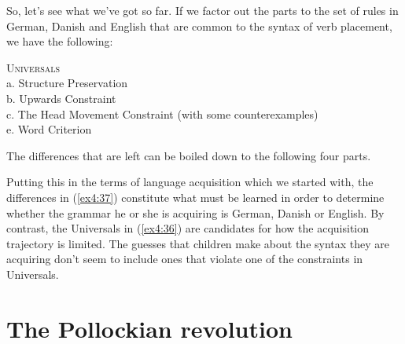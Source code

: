 So, let's see what we've got so far. If we factor out the parts to the set of rules in German, Danish and English that are common to the syntax of verb placement, we have the following:
\begin{exe}
	\ex \label{ex4:36} \textsc{Universals}\\
								a. Structure Preservation\\ 
								b. Upwards Constraint\\ 
								c. The Head Movement Constraint (with some counterexamples)\\ 
								e. Word Criterion
\end{exe}
The differences that are left can be boiled down to the following four parts.
\enlargethispage*{22pt}
\begin{exe}
	\ex \label{ex4:37} 
	\begin{xlist}
	\end{xlist}
\end{exe}
Putting this in the terms of language acquisition which we started with, the differences in (\ref{ex4:37}) constitute what must be learned in order to determine whether the grammar he or she is acquiring is German, Danish or English. By contrast, the Universals in (\ref{ex4:36}) are candidates for how the acquisition trajectory is limited. The guesses that children make about the syntax they are acquiring don't seem to include ones that violate one of the constraints in Universals.

\section{The Pollockian revolution}

